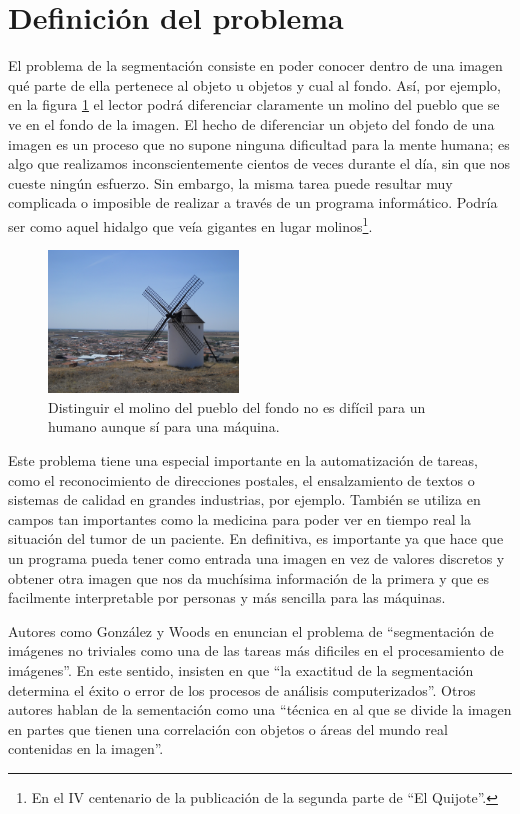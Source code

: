 \section{Definición del problema}\label{sec:definicion}
El problema de la segmentación consiste en poder conocer dentro de una imagen qué parte de ella pertenece al objeto u objetos y cual al fondo. Así, por ejemplo, en la figura \ref{img:ejemplomolino} el lector podrá diferenciar claramente un molino del pueblo que se ve en el fondo de la imagen. El hecho de diferenciar un objeto del fondo de una imagen es un proceso que no supone ninguna dificultad para la mente humana; es algo que realizamos inconscientemente cientos de veces durante el día, sin que nos cueste ningún esfuerzo. Sin embargo, la misma tarea puede resultar muy complicada o imposible de realizar a través de un programa informático. Podría ser como aquel hidalgo que veía gigantes en lugar molinos\footnote{En el IV centenario de la publicación de la segunda parte de ``El Quijote''.}.

\begin{figure}
	\centering
	\includegraphics[width=0.45\textwidth]{img/molino.jpg}
	\caption{Distinguir el molino del pueblo del fondo no es difícil para un humano aunque sí para una máquina.}
	\label{img:ejemplomolino}
\end{figure}

Este problema tiene una especial importante en la automatización de tareas, como el reconocimiento de direcciones postales, el ensalzamiento de textos o sistemas de calidad en grandes industrias, por ejemplo. También se utiliza en campos tan importantes como la medicina para poder ver en tiempo real la situación del tumor de un paciente. En definitiva, es importante ya que hace que un programa pueda tener como entrada una imagen en vez de valores discretos y obtener otra imagen que nos da muchísima información de la primera y que es facilmente interpretable por personas y más sencilla para las máquinas.

Autores como González y Woods en \cite{lib:gonzalez} enuncian el problema de ``segmentación de imágenes no triviales como una de las tareas más dificiles en el procesamiento de imágenes''. En este sentido, insisten en que ``la exactitud de la segmentación determina el éxito o error de los procesos de análisis computerizados''. Otros autores \cite{lib:sonka} hablan de la sementación como una ``técnica en al que se divide la imagen en partes que tienen una correlación con objetos o áreas del mundo real contenidas en la imagen''.

